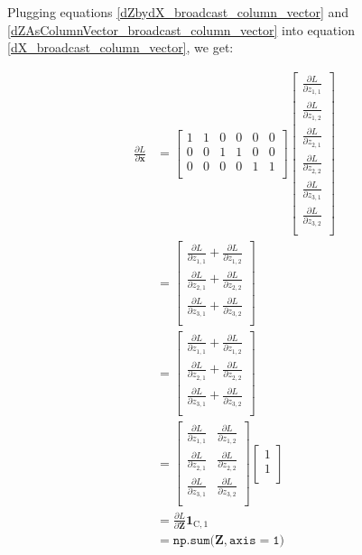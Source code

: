 \documentclass{article}
\newcommand{\vecr}[1]{\bm{#1}}
\newcommand{\matr}[1]{\mathbf{#1}} %
\begin{document}
Plugging equations \ref{dZbydX_broadcast_column_vector} and \ref{dZAsColumnVector_broadcast_column_vector} into equation \ref{dX_broadcast_column_vector}, we get:

\begin{align}
\frac{\partial L}{\partial \vecr{x}} &=
\begin{bmatrix}
1 & 1 & 0 & 0 & 0 & 0\\%
0 & 0 & 1 & 1 & 0 & 0\\%
0 & 0 & 0 & 0 & 1 & 1\\%
\end{bmatrix}
\begin{bmatrix}
\frac{\partial L}{\partial z_{1,1}} \\[0.7em]
\frac{\partial L}{\partial z_{1,2}} \\[0.7em]
\frac{\partial L}{\partial z_{2,1}} \\[0.7em]
\frac{\partial L}{\partial z_{2,2}} \\[0.7em]
\frac{\partial L}{\partial z_{3,1}} \\[0.7em]
\frac{\partial L}{\partial z_{3,2}} \\[0.7em]
\end{bmatrix}
\nonumber \\
&=
\begin{bmatrix}
\frac{\partial L}{\partial z_{1,1}} +
\frac{\partial L}{\partial z_{1,2}} \\[0.7em]
\frac{\partial L}{\partial z_{2,1}} +
\frac{\partial L}{\partial z_{2,2}} \\[0.7em]
\frac{\partial L}{\partial z_{3,1}} +
\frac{\partial L}{\partial z_{3,2}} \\[0.7em]
\end{bmatrix} \nonumber
\\
&=
\begin{bmatrix}
\frac{\partial L}{\partial z_{1,1}} +
\frac{\partial L}{\partial z_{1,2}} \\[0.7em]
\frac{\partial L}{\partial z_{2,1}} +
\frac{\partial L}{\partial z_{2,2}} \\[0.7em]
\frac{\partial L}{\partial z_{3,1}} +
\frac{\partial L}{\partial z_{3,2}} \\[0.7em]
\end{bmatrix} \nonumber
\\
&=
\begin{bmatrix}
\frac{\partial L}{\partial z_{1,1}} & \frac{\partial L}{\partial z_{1,2}} \\[0.7em]
\frac{\partial L}{\partial z_{2,1}} & \frac{\partial L}{\partial z_{2,2}} \\[0.7em]
\frac{\partial L}{\partial z_{3,1}} & \frac{\partial L}{\partial z_{3,2}} \\[0.7em]
\end{bmatrix}
\begin{bmatrix}
1 \\
1 \\
\end{bmatrix} \nonumber
\\
&=
\frac{\partial L}{\partial \matr{Z}} \mathbf{1}_{\text{C},1} \nonumber
\\
&= \mathtt{np.sum(} \matr{Z} \mathtt{, axis=1)}
\end{align}
\end{document}
